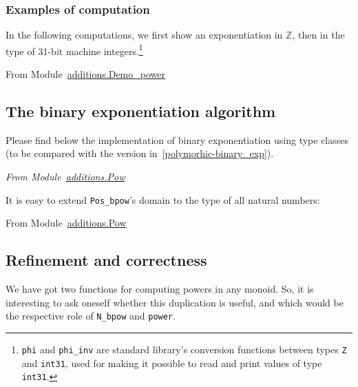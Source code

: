 


\subsubsection{Examples of computation}

In the following computations, we first show an exponentiation in $\mathds{Z}$, then in
the type of 31-bit machine integers.\footnote{\texttt{phi} and \texttt{phi\_inv} are 
standard library's conversion
functions between types \texttt{Z} and \texttt{int31}, used for making it possible to read  and print values of type \texttt{int31}.}

\vspace{4pt}

From Module~\href{../theories/html/additions.Demo_power.html}{additions.Demo\_power}



\subsection{The binary exponentiation algorithm}

Please find below the implementation of binary exponentiation using type classes
(to be compared with the version in~\vref{polymorhic-binary_exp}).



\pagebreak

\emph{From Module~\href{../theories/html/additions.Pow.html}{additions.Pow}}




It is easy to extend \texttt{Pos\_bpow}'s domain to the type of all 
natural numbers:

\vspace{4pt}
From Module~\href{../theories/html/additions.Pow.html}{additions.Pow}


\subsection{Refinement and correctness}
We have got two functions for computing powers in any monoid. 
So, it is interesting to ask oneself whether this duplication is useful, and which would be the respective role of \texttt{N\_bpow} and \texttt{power}.

